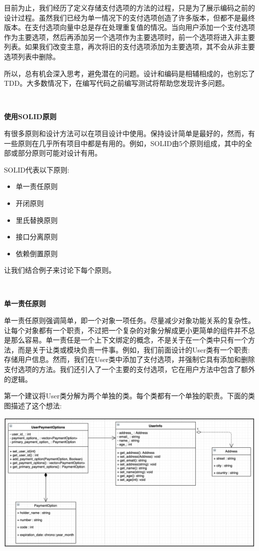 目前为止，我们经历了定义存储支付选项的方法的过程，只是为了展示编码之前的设计过程。虽然我们已经为单一情况下的支付选项创造了许多版本，但都不是最终版本。在支付选项向量中总是存在处理重复值的情况。当向用户添加一个支付选项作为主要选项，然后再添加另一个选项作为主要选项时，前一个选项将进入非主要列表。如果我们改变主意，再次将旧的支付选项添加为主要选项，其不会从非主要选项列表中删除。 \par
所以，总有机会深入思考，避免潜在的问题。设计和编码是相辅相成的，也别忘了TDD。大多数情况下，在编写代码之前编写测试将帮助您发现许多问题。 \par

\noindent\textbf{}\ \par
\textbf{使用SOLID原则} \ \par
有很多原则和设计方法可以在项目设计中使用。保持设计简单是最好的，然而，有一些原则在几乎所有项目中都是有用的。例如，SOLID由5个原则组成，其中的全部或部分原则可能对设计有用。 \par
SOLID代表以下原则: \par

\begin{itemize}
	\item 单一责任原则
	\item 开闭原则
	\item 里氏替换原则
	\item 接口分离原则
	\item 依赖倒置原则
\end{itemize}

让我们结合例子来讨论下每个原则。

\noindent\textbf{}\ \par
\textbf{单一责任原则} \ \par
单一责任原则强调简单，即一个对象一项任务。尽量减少对象功能关系的复杂性。让每个对象都有一个职责，不过把一个复杂的对象分解成更小更简单的组件并不总是那么容易。单一责任是一个上下文绑定的概念，不是关于在一个类中只有一个方法，而是关于让类或模块负责一件事。例如，我们前面设计的User类有一个职责:存储用户信息。然而，我们在User类中添加了支付选项，并强制它具有添加和删除支付选项的方法。我们还引入了一个主要的支付选项，它在用户方法中包含了额外的逻辑。 \par
第一个建议将User类分解为两个单独的类。每个类都有一个单独的职责。下面的类图描述了这个想法: \par

\begin{center}
	\includegraphics[width=1.\textwidth]{content/Section-2/Chapter-10/8}
\end{center}

